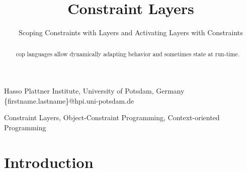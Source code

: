 \documentclass[preprint,authoryear,10pt]{sigplanconf}
\begin{document}
\setlength{\pdfpageheight}{\paperheight}
\setlength{\pdfpagewidth}{\paperwidth}



\exclusivelicense                %



\title{Constraint Layers}
\subtitle{Scoping Constraints with Layers and Activating Layers with Constraints}

           {Hasso Plattner Institute, University of Potsdam, Germany}
           {\{firstname.lastname\}@hpi.uni-potsdam.de}

\maketitle

\begin{abstract}
\gls{cop} languages allow dynamically adapting behavior and sometimes state at run-time.
\end{abstract}


\keywords
Constraint Layers, Object-Constraint Programming, Context-oriented Programming

\section{Introduction}


\end{document}
